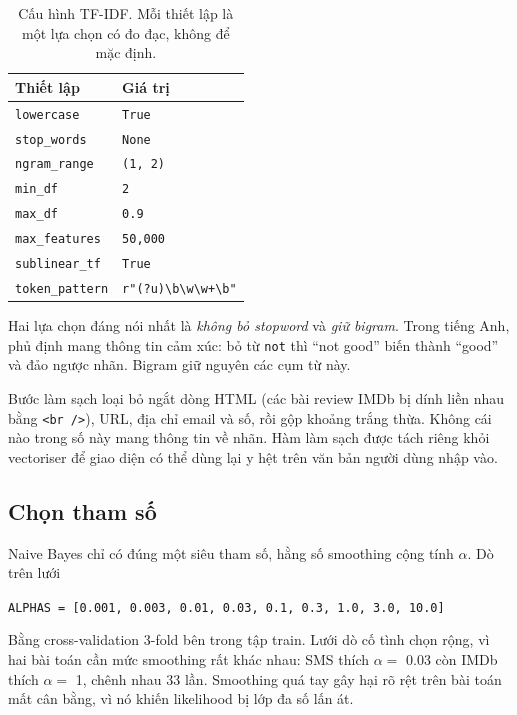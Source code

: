 \documentclass[11pt,a4paper]{article}
\newcommand{\code}[1]{\texttt{#1}}
\begin{document}
\begin{table}[H]
\centering
\caption{Cấu hình TF-IDF. Mỗi thiết lập là một lựa chọn có đo đạc, không để mặc định.}
\label{tab:vec}
\begin{tabular}{ll}
\toprule
\textbf{Thiết lập} & \textbf{Giá trị} \\
\midrule
\code{lowercase} & \code{True} \\
\code{stop\_words} & \code{None} \\
\code{ngram\_range} & \code{(1, 2)} \\
\code{min\_df} & \code{2} \\
\code{max\_df} & \code{0.9} \\
\code{max\_features} & \code{50,000} \\
\code{sublinear\_tf} & \code{True} \\
\code{token\_pattern} & \code{r"(?u)\textbackslash b\textbackslash w\textbackslash w+\textbackslash b"} \\
\bottomrule
\end{tabular}
\end{table}

Hai lựa chọn đáng nói nhất là \emph{không bỏ stopword} và \emph{giữ bigram}. Trong tiếng Anh, phủ định mang thông tin cảm xúc: bỏ từ \code{not} thì ``not good'' biến thành ``good'' và đảo ngược nhãn. Bigram giữ nguyên các cụm từ này.

Bước làm sạch loại bỏ ngắt dòng HTML (các bài review IMDb bị dính liền nhau bằng \code{<br />}), URL, địa chỉ email và số, rồi gộp khoảng trắng thừa. Không cái nào trong số này mang thông tin về nhãn. Hàm làm sạch được tách riêng khỏi vectoriser để giao diện có thể dùng lại y hệt trên văn bản người dùng nhập vào.

\subsection{Chọn tham số}

Naive Bayes chỉ có đúng một siêu tham số, hằng số smoothing cộng tính $\alpha$. Dò trên lưới

\begin{center}
\code{ALPHAS = [0.001, 0.003, 0.01, 0.03, 0.1, 0.3, 1.0, 3.0, 10.0]}
\end{center}

Bằng cross-validation 3-fold bên trong tập train. Lưới dò cố tình chọn rộng, vì hai bài toán cần mức smoothing rất khác nhau: SMS thích $\alpha =$ 0.03 còn IMDb thích $\alpha =$ 1, chênh nhau 33 lần. Smoothing quá tay gây hại rõ rệt trên bài toán mất cân bằng, vì nó khiến likelihood bị lớp đa số lấn át.
\end{document}

